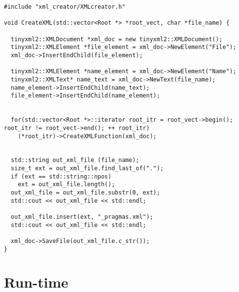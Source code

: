 \documentclass[a4paper,10pt,twoside]{book}
\begin{document}
\begin{lstlisting}[language=CCC, caption=xml\_creator/xml\_creator.cpp]
#include "xml_creator/XMLcreator.h"

void CreateXML(std::vector<Root *> *root_vect, char *file_name) {
  
  tinyxml2::XMLDocument *xml_doc = new tinyxml2::XMLDocument();
  tinyxml2::XMLElement *file_element = xml_doc->NewElement("File");
  xml_doc->InsertEndChild(file_element);

  tinyxml2::XMLElement *name_element = xml_doc->NewElement("Name");
  tinyxml2::XMLText* name_text = xml_doc->NewText(file_name);
  name_element->InsertEndChild(name_text);
  file_element->InsertEndChild(name_element);


  for(std::vector<Root *>::iterator root_itr = root_vect->begin(); root_itr != root_vect->end(); ++ root_itr)     
    (*root_itr)->CreateXMLFunction(xml_doc);
  

  std::string out_xml_file (file_name);
  size_t ext = out_xml_file.find_last_of(".");
  if (ext == std::string::npos)
    ext = out_xml_file.length();
  out_xml_file = out_xml_file.substr(0, ext);
  std::cout << out_xml_file << std::endl;
  
  out_xml_file.insert(ext, "_pragmas.xml");
  std::cout << out_xml_file << std::endl;

  xml_doc->SaveFile(out_xml_file.c_str());
}
\end{lstlisting}


\section{Run-time}
\end{document}
